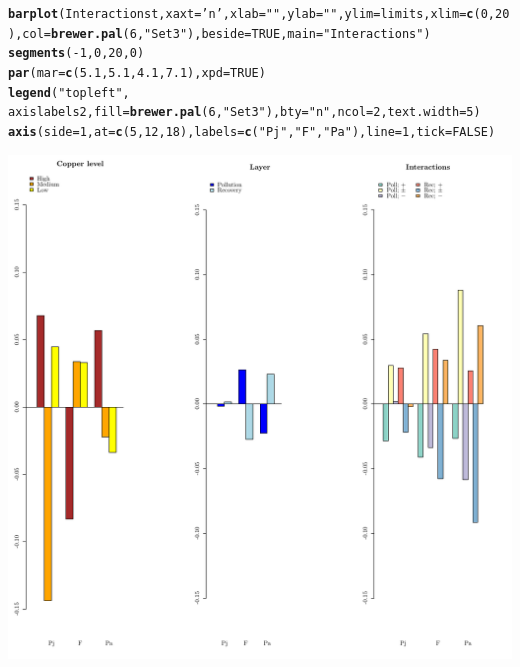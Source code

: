 \documentclass{article}\usepackage[]{graphicx}\usepackage[]{color}
\makeatletter
\def\maxwidth{ %
  \ifdim\Gin@nat@width>\linewidth
    \linewidth
  \else
    \Gin@nat@width
  \fi
}
\newcommand{\hlnum}[1]{\textcolor[rgb]{0.686,0.059,0.569}{#1}}%
\newcommand{\hlstr}[1]{\textcolor[rgb]{0.192,0.494,0.8}{#1}}%
\newcommand{\hlopt}[1]{\textcolor[rgb]{0,0,0}{#1}}%
\newcommand{\hlstd}[1]{\textcolor[rgb]{0.345,0.345,0.345}{#1}}%
\newcommand{\hlkwc}[1]{\textcolor[rgb]{0.333,0.667,0.333}{#1}}%
\newcommand{\hlkwd}[1]{\textcolor[rgb]{0.737,0.353,0.396}{\textbf{#1}}}%
\newenvironment{kframe}{%
 \def\at@end@of@kframe{}%
 \ifinner\ifhmode%
  \def\at@end@of@kframe{\end{minipage}}%
  \begin{minipage}{\columnwidth}%
 \fi\fi%
 \def\FrameCommand##1{\hskip\@totalleftmargin \hskip-\fboxsep
 \colorbox{shadecolor}{##1}\hskip-\fboxsep
     \hskip-\linewidth \hskip-\@totalleftmargin \hskip\columnwidth}%
 \MakeFramed {\advance\hsize-\width
   \@totalleftmargin\z@ \linewidth\hsize
   \@setminipage}}%
 {\par\unskip\endMakeFramed%
 \at@end@of@kframe}
\newenvironment{knitrout}{}{} %
\makeatother
\begin{document}
\begin{knitrout}
\begin{kframe}
\begin{alltt}
\hlkwd{barplot}\hlstd{(Interactionst,} \hlkwc{xaxt}\hlstd{=}\hlstr{'n'}\hlstd{,} \hlkwc{xlab}\hlstd{=}\hlstr{""}\hlstd{,} \hlkwc{ylab}\hlstd{=}\hlstr{""}\hlstd{,} \hlkwc{ylim}\hlstd{=limits,} \hlkwc{xlim}\hlstd{=}\hlkwd{c}\hlstd{(}\hlnum{0}\hlstd{,}\hlnum{20}\hlstd{),} \hlkwc{col}\hlstd{=}\hlkwd{brewer.pal}\hlstd{(}\hlnum{6}\hlstd{,} \hlstr{"Set3"}\hlstd{) ,} \hlkwc{beside}\hlstd{=}\hlnum{TRUE}\hlstd{,} \hlkwc{main}\hlstd{=}\hlstr{"Interactions"}\hlstd{)}
\hlkwd{segments}\hlstd{(}\hlopt{-}\hlnum{1}\hlstd{,}\hlnum{0}\hlstd{,} \hlnum{20}\hlstd{,}\hlnum{0}\hlstd{)}
\hlkwd{par}\hlstd{(}\hlkwc{mar}\hlstd{=}\hlkwd{c}\hlstd{(}\hlnum{5.1}\hlstd{,} \hlnum{5.1}\hlstd{,} \hlnum{4.1}\hlstd{,} \hlnum{7.1}\hlstd{),} \hlkwc{xpd}\hlstd{=}\hlnum{TRUE}\hlstd{)}
\hlkwd{legend}\hlstd{(}\hlstr{"topleft"}\hlstd{,}
     \hlstd{axislabels2,} \hlkwc{fill}\hlstd{=}\hlkwd{brewer.pal}\hlstd{(}\hlnum{6}\hlstd{,} \hlstr{"Set3"}\hlstd{),} \hlkwc{bty}\hlstd{=}\hlstr{"n"}\hlstd{,} \hlkwc{ncol}\hlstd{=}\hlnum{2}\hlstd{,}\hlkwc{text.width}\hlstd{=}\hlnum{5}\hlstd{)}
\hlkwd{axis}\hlstd{(}\hlkwc{side}\hlstd{=}\hlnum{1}\hlstd{,} \hlkwc{at}\hlstd{=}\hlkwd{c}\hlstd{(}\hlnum{5}\hlstd{,}\hlnum{12}\hlstd{,}\hlnum{18}\hlstd{),} \hlkwc{labels}\hlstd{=}\hlkwd{c}\hlstd{(} \hlstr{"Pj"}\hlstd{,} \hlstr{"F"}\hlstd{,} \hlstr{"Pa"}\hlstd{),} \hlkwc{line}\hlstd{=}\hlnum{1}\hlstd{,} \hlkwc{tick}\hlstd{=}\hlnum{FALSE}\hlstd{)}
\end{alltt}
\end{kframe}
\includegraphics[width=\maxwidth]{figure/tReco_vs_Post-1} 

\end{knitrout}
\end{document}
